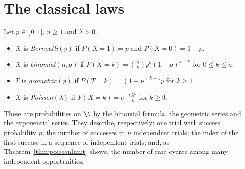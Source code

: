 \section{The classical laws}

\begin{definition}
Let $p\in\,]0,1[$, $n\ge1$ and $\lambda>0$.
\begin{itemize}
\item $X$ is \emph{Bernoulli}$(p)$ if $P(X=1)=p$ and $P(X=0)=1-p$.
\item $X$ is \emph{binomial}$(n,p)$ if $P(X=k)=\binom nkp^k(1-p)^{n-k}$ for $0\le k\le n$.
\item $T$ is \emph{geometric}$(p)$ if $P(T=k)=(1-p)^{k-1}p$ for $k\ge1$.
\item $X$ is \emph{Poisson}$(\lambda)$ if $P(X=k)=e^{-\lambda}\frac{\lambda^k}{k!}$ for $k\ge0$.
\end{itemize}
\end{definition}

These are probabilities on $\N$ by the binomial formula, the geometric series and the exponential series. They
describe, respectively: one trial with success probability $p$; the number of successes in $n$ independent trials;
the index of the first success in a sequence of independent trials; and, as Theorem~\ref{thm:poissonlimit} shows,
the number of rare events among many independent opportunities.

